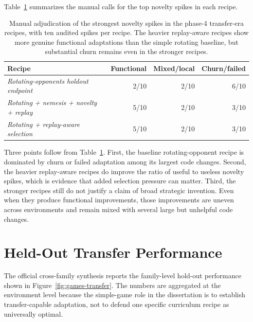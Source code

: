 Table~\ref{tab:games-novelty} summarizes the manual calls for the top novelty spikes in each
recipe.

\begin{table}[t]
\centering
\small
\setlength{\tabcolsep}{6pt}
\begin{tabular}{
  >{\raggedright\arraybackslash}p{2.35in}
  r
  r
  r
}
\toprule
Recipe & Functional & Mixed/local & Churn/failed \\
\midrule
\emph{Rotating-opponents holdout endpoint} & 2/10 & 2/10 & 6/10 \\
\emph{Rotating + nemesis + novelty + replay} & 5/10 & 2/10 & 3/10 \\
\emph{Rotating + replay-aware selection} & 5/10 & 2/10 & 3/10 \\
\bottomrule
\end{tabular}
\caption[Manual novelty adjudication results]{Manual adjudication of the strongest novelty spikes in the phase-4 transfer-era recipes,
with ten audited spikes per recipe. The heavier replay-aware recipes show more genuine functional
adaptations than the simple rotating baseline, but substantial churn remains even in the stronger
recipes.}
\label{tab:games-novelty}
\end{table}

Three points follow from Table~\ref{tab:games-novelty}. First, the baseline rotating-opponent
recipe is dominated by churn or failed adaptation among its largest code changes. Second, the
heavier replay-aware recipes do improve the ratio of useful to useless novelty spikes, which is
evidence that added selection pressure can matter. Third, the stronger recipes still do not justify
a claim of broad strategic invention. Even when they produce functional improvements, those
improvements are uneven across environments and remain mixed with several large but unhelpful code
changes.

\section{Held-Out Transfer Performance}
\label{sec:games-transfer}

The official cross-family synthesis reports the family-level hold-out performance shown in
Figure~\ref{fig:games-transfer}. The numbers are aggregated at the environment level because the
simple-game role in the dissertation is to establish transfer-capable adaptation, not to defend one
specific curriculum recipe as universally optimal.

